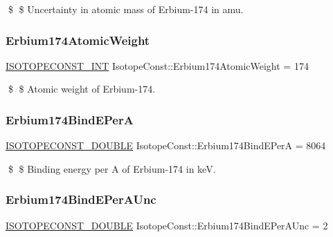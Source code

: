 \$ \$ Uncertainty in atomic mass of Erbium-\/174 in amu. \mbox{\label{group___isotope_const-_erbium-_er174_gad4945c4f8c121d1b5e81a44ae279f2c0}} 
\subsubsection{\texorpdfstring{Erbium174\+Atomic\+Weight}{Erbium174AtomicWeight}}
{\footnotesize\ttfamily \mbox{\hyperlink{group___isotope_const-_macros_ga5f18360b3e99483a35c32d789e62621c}{I\+S\+O\+T\+O\+P\+E\+C\+O\+N\+S\+T\+\_\+\+I\+NT}} Isotope\+Const\+::\+Erbium174\+Atomic\+Weight = 174}

\$ \$ Atomic weight of Erbium-\/174. \mbox{\label{group___isotope_const-_erbium-_er174_gaeb280a886ee0f86edfbf1810ee6d29c4}} 
\subsubsection{\texorpdfstring{Erbium174\+Bind\+E\+PerA}{Erbium174BindEPerA}}
{\footnotesize\ttfamily \mbox{\hyperlink{group___isotope_const-_macros_ga8f45a7272ce02c0b4c65c44636ed719a}{I\+S\+O\+T\+O\+P\+E\+C\+O\+N\+S\+T\+\_\+\+D\+O\+U\+B\+LE}} Isotope\+Const\+::\+Erbium174\+Bind\+E\+PerA = 8064}

\$ \$ Binding energy per A of Erbium-\/174 in keV. \mbox{\label{group___isotope_const-_erbium-_er174_gabf30e01c461e1e4025bbe2403581cc8b}} 
\subsubsection{\texorpdfstring{Erbium174\+Bind\+E\+Per\+A\+Unc}{Erbium174BindEPerAUnc}}
{\footnotesize\ttfamily \mbox{\hyperlink{group___isotope_const-_macros_ga8f45a7272ce02c0b4c65c44636ed719a}{I\+S\+O\+T\+O\+P\+E\+C\+O\+N\+S\+T\+\_\+\+D\+O\+U\+B\+LE}} Isotope\+Const\+::\+Erbium174\+Bind\+E\+Per\+A\+Unc = 2}

